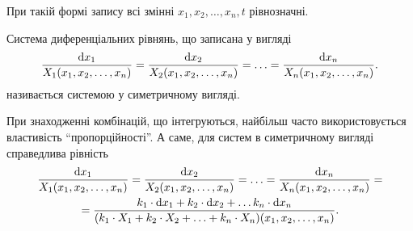 При такій формі запису всі змінні $x_1, x_2, \ldots, x_n, t$ рівнозначні. \parvskip

Система диференціальних рівнянь, що записана у вигляді
\begin{equation*}
	\frac{\mathop{}\!\mathrm{d} x_1}{X_1(x_1, x_2, \ldots, x_n)} = \frac{\mathop{}\!\mathrm{d} x_2}{X_2 (x_1, x_2, \ldots, x_n)} = \ldots = \frac{\mathop{}\!\mathrm{d} x_n}{X_n (x_1, x_2, \ldots, x_n)}.
\end{equation*}
називається системою у симетричному вигляді. \parvskip

При знаходженні комбінацій, що інтегруються, найбільш часто використовується властивість ``пропорційності''. А саме, для систем в симетричному вигляді справедлива рівність
\begin{multline*}
	\frac{\mathop{}\!\mathrm{d} x_1}{X_1(x_1, x_2, \ldots, x_n)} = \frac{\mathop{}\!\mathrm{d} x_2}{X_2 (x_1, x_2, \ldots, x_n)} = \ldots = \frac{\mathop{}\!\mathrm{d} x_n}{X_n (x_1, x_2, \ldots, x_n)} = \\
	= \frac{k_1 \cdot \mathop{}\!\mathrm{d} x_1 + k_2 \cdot \mathop{}\!\mathrm{d} x_2 + \ldots k_n \cdot \mathop{}\!\mathrm{d} x_n}{(k_1 \cdot X_1  + k_2 \cdot X_2  + \ldots + k_n \cdot X_n) (x_1, x_2, \ldots, x_n)}.
\end{multline*}
